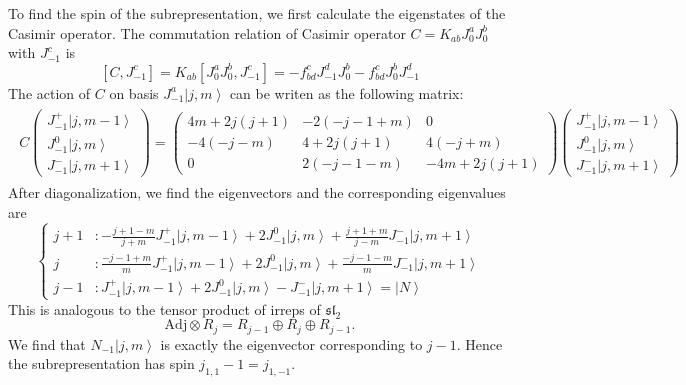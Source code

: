 \documentclass[10pt,a4paper]{article}
\numberwithin{equation}{section}
\newcommand{\ket}[1]{\left| #1 \right\rangle}
\begin{document}
To find the spin of the subrepresentation, we first calculate the eigenstates of the Casimir operator.
The commutation relation of Casimir operator $C = K_{ab} J^{a}_{0} J^{b}_{0}$ with $J^{c}_{-1}$ is 
\begin{equation}
        \left[C,J^{c}_{-1}\right] = K_{ab}\left[J^{a}_{0}J^{b}_{0},J^{c}_{-1}\right]
        = -f^{c}_{bd} J^{d}_{-1}J^{b}_{0} - f^{c}_{bd}J^{b}_{0}J^{d}_{-1}
\end{equation}
The action of $C$ on basis $J^{a}_{-1} \ket{j,m}$ can be writen as the following matrix:
\begin{eqnarray}
    \begin{aligned}
        C 
    \begin{pmatrix}
    J^{+}_{-1} \ket{j,m-1}\\
    J^{0}_{-1} \ket{j,m}\\
    J^{-}_{-1} \ket{j,m+1}
    \end{pmatrix}
    = \begin{pmatrix}
        4m+2j(j+1) & -2 (-j-1+m) & 0\\
        -4 (-j-m) & 4 + 2j(j+1) & 4(-j+m)\\
        0 & 2 (-j-1-m)& -4m + 2j(j+1)
    \end{pmatrix}
    \begin{pmatrix}
        J^{+}_{-1} \ket{j,m-1}\\
        J^{0}_{-1} \ket{j,m}\\
        J^{-}_{-1} \ket{j,m+1}
    \end{pmatrix}
    \end{aligned}
\end{eqnarray}
After diagonalization, we find the eigenvectors and the corresponding eigenvalues are 
\begin{equation}
    \left\{
        \begin{aligned}
            j+1 &: -\frac{j+1-m}{j+m} J^{+}_{-1} \ket{j,m-1} + 2 J^{0}_{-1} \ket{j,m} + \frac{j+1+m}{j-m} J^{-}_{-1} \ket{j,m+1}\\
            j &: \frac{-j-1+m}{m} J^{+}_{-1} \ket{j,m-1} + 2 J^{0}_{-1} \ket{j,m} + \frac{-j-1-m}{m} J^{-}_{-1} \ket{j,m+1}\\
            j-1 &: J^{+}_{-1} \ket{j,m-1} + 2 J^{0}_{-1} \ket{j,m} - J^{-}_{-1} \ket{j,m+1} = \ket{N}
        \end{aligned}
    \right.
\end{equation}
This is analogous to the tensor product of irreps of $\mathfrak{sl}_{2}$
\begin{equation}
    \mathrm{Adj} \otimes R_{j} = R_{j-1} \oplus R_{j} \oplus R_{j-1}.
\end{equation}
We find that $N_{-1}\ket{j,m}$ is exactly the eigenvector corresponding to $j-1$. Hence the subrepresentation has spin $j_{1,1}-1 = j_{1,-1}$.
\end{document}
